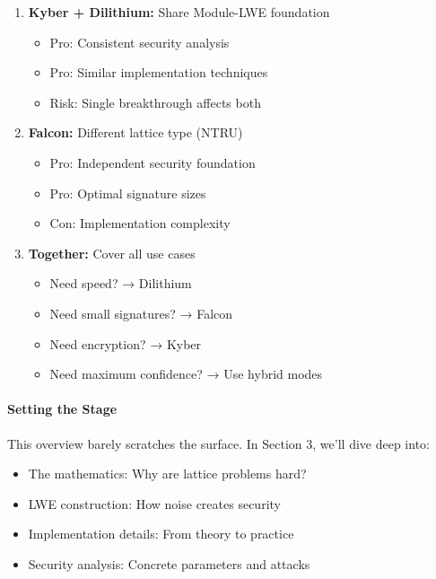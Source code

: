 \documentclass[11pt,a4paper]{article}
\begin{document}
\begin{enumerate}
    \item \textbf{Kyber + Dilithium:} Share Module-LWE foundation
    \begin{itemize}
        \item Pro: Consistent security analysis
        \item Pro: Similar implementation techniques
        \item Risk: Single breakthrough affects both
    \end{itemize}
    
    \item \textbf{Falcon:} Different lattice type (NTRU)
    \begin{itemize}
        \item Pro: Independent security foundation
        \item Pro: Optimal signature sizes
        \item Con: Implementation complexity
    \end{itemize}
    
    \item \textbf{Together:} Cover all use cases
    \begin{itemize}
        \item Need speed? → Dilithium
        \item Need small signatures? → Falcon
        \item Need encryption? → Kyber
        \item Need maximum confidence? → Use hybrid modes
    \end{itemize}
\end{enumerate}

\paragraph{Setting the Stage}

This overview barely scratches the surface. In Section 3, we'll dive deep into:
\begin{itemize}
    \item The mathematics: Why are lattice problems hard?
    \item LWE construction: How noise creates security
    \item Implementation details: From theory to practice
    \item Security analysis: Concrete parameters and attacks
\end{itemize}
\end{document}
